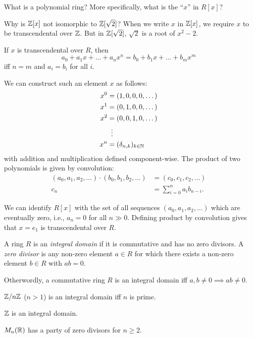 What is a polynomial ring?
More specifically, what is the ``$x$'' in $R[x]$?

Why is $\mathbb{Z}[x]$ not isomorphic to $\mathbb{Z}[\sqrt 2]$?
When we write $x$ in $\mathbb{Z}[x]$, we require $x$ to be transcendental over $\mathbb{Z}$.
But in $\mathbb{Z}[\sqrt 2]$, $\sqrt 2$ is a root of $x^2 - 2$.

If $x$ is transcendental over $R$, then \[
    a_0 + a_1 x + \dots + a_n x^n = b_0 + b_1 x + \dots + b_m x^m
\] iff $n = m$ and $a_i = b_i$ for all $i$.

We can construct such an element $x$ as follows:
\begin{align*}
    x^0 &= (1, 0, 0, 0, \dots) \\
    x^1 &= (0, 1, 0, 0, \dots) \\
    x^2 &= (0, 0, 1, 0, \dots) \\
    &\mathrel{\makebox[\widthof{=}]{\vdots}} \\
    x^n &= (\delta_{n, k})_{k \in \N}
\end{align*}
with addition and multiplication defined component-wise.
The product of two polynomials is given by convolution:
\begin{align*}
    (a_0, a_1, a_2, \dots) \cdot (b_0, b_1, b_2, \dots)
    &= (c_0, c_1, c_2, \dots) \\
    c_n &= \sum_{i = 0}^n a_i b_{n - i}.
\end{align*}

We can identify $R[x]$ with the set of all sequences
$(a_0, a_1, a_2, \dots)$ which are eventually zero, i.e.,
$a_n = 0$ for all $n \gg 0$.
Defining product by convolution gives that $x = e_1$ is transcendental over
$R$.

\begin{definition} \label{def:ring:int}
    A ring $R$ is an \emph{integral domain} if it is commutative and has no
    zero divisors.
    A \emph{zero divisor} is any non-zero element $a \in R$ for which there
    exists a non-zero element $b \in R$ with $ab = 0$.
\end{definition}
Otherwordly, a commutative ring $R$ is an integral domain iff
$a, b \ne 0 \implies ab \ne 0$.
\begin{examples}
    \item $\mathbb{Z}/n\mathbb{Z}$ ($n > 1$) is an integral domain iff $n$ is prime.
    \item $\mathbb{Z}$ is an integral domain.
    \item $M_n(\mathbb{R})$ has a party of zero divisors for $n \ge 2$.
\end{examples}


